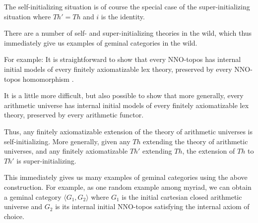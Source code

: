 The self-initializing situation is of course the special case of the super-initializing situation where $Th' = Th$ and $i$ is the identity.

There are a number of self- and super-initializing theories in the wild, which thus immediately give us examples of geminal categories in the wild.

For example: It is straightforward to show that every NNO-topos has internal initial models of every finitely axiomatizable lex theory, preserved by every NNO-topos homomorphism .

It is a little more difficult, but also possible to show that more generally, every arithmetic universe has internal initial models of every finitely axiomatizable lex theory, preserved by every arithmetic functor. 

Thus, any finitely axiomatizable extension of the theory of arithmetic universes is self-initializing. More generally, given any $Th$ extending the theory of arithmetic universes, and any finitely axiomatizable $Th'$ extending $Th$, the extension of $Th$ to $Th'$ is super-initializing. 

This immediately gives us many examples of geminal categories using the above construction. For example, as one random example among myriad, we can obtain a geminal category $\langle G_1, G_2 \rangle$ where $G_1$ is the initial cartesian closed arithmetic universe and $G_2$ is its internal initial NNO-topos satisfying the internal axiom of choice.


